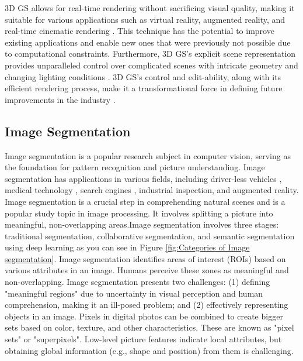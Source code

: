 3D GS allows for real-time rendering without sacrificing visual quality, making it suitable for various applications such as virtual reality, augmented reality, and real-time cinematic rendering \cite{kalkofen2008comprehensible,patney2016towards,albert2017latency}. This technique has the potential to improve existing applications and enable new ones that were previously not possible due to computational constraints. Furthermore, 3D GS's explicit scene representation provides unparalleled control over complicated scenes with intricate geometry and changing lighting conditions \cite{chabra2020deep,wang2021learning}. 3D GS's control and edit-ability, along with its efficient rendering process, make it a transformational force in defining future improvements in the industry \cite{chen2024survey}.



\subsection{Image Segmentation}
Image segmentation is a popular research subject in computer vision, serving as the foundation for pattern recognition and picture understanding. Image segmentation has applications in various fields, including driver-less vehicles \cite{kabiraj2023number}, medical technology \cite{zhao2021voxelembed, jin2020deep}, search engines \cite{yao2021compound}, industrial inspection, and augmented reality. 
Image segmentation is a crucial step in comprehending natural scenes and is a popular study topic in image processing. It involves splitting a picture into meaningful, non-overlapping areas.Image segmentation involves three stages: traditional segmentation, collaborative segmentation, and semantic segmentation using deep learning as you can see in Figure \ref{fig:Categories of Image segmentation}. Image segmentation identifies areas of interest (ROIs) based on various attributes in an image. Humans perceive these zones as meaningful and non-overlapping. Image segmentation presents two challenges: (1) defining "meaningful regions" due to uncertainty in visual perception and human comprehension, making it an ill-posed problem; and (2) effectively representing objects in an image. Pixels in digital photos can be combined to create bigger sets based on color, texture, and other characteristics. These are known as "pixel sets" or "superpixels". Low-level picture features indicate local attributes, but obtaining global information (e.g., shape and position) from them is challenging.
\cite{yu2023techniques}


